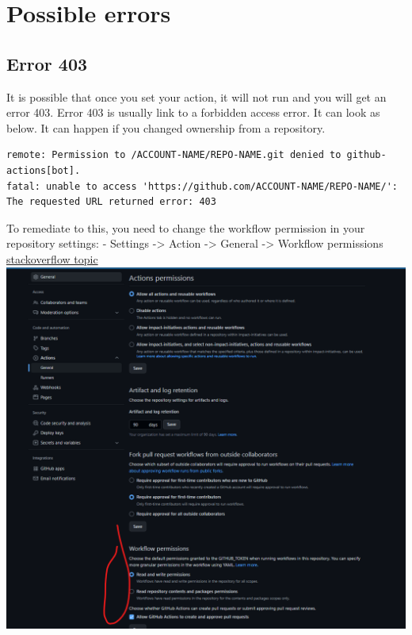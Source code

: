 \documentclass[
]{book}
\begin{document}
\hypertarget{possible-errors}{%
\section{Possible errors}\label{possible-errors}}

\hypertarget{error-403}{%
\subsection{Error 403}\label{error-403}}

It is possible that once you set your action, it will not run and you will get an error 403. Error
403 is usually link to a forbidden access error. It can look as below. It can happen if you changed ownership from a repository.

\begin{verbatim}
remote: Permission to /ACCOUNT-NAME/REPO-NAME.git denied to github-actions[bot].
fatal: unable to access 'https://github.com/ACCOUNT-NAME/REPO-NAME/': The requested URL returned error: 403
\end{verbatim}

To remediate to this, you need to change the workflow permission in your repository settings:
- Settings -\textgreater{} Action -\textgreater{} General -\textgreater{} Workflow permissions \href{https://stackoverflow.com/questions/73687176/permission-denied-to-github-actionsbot-the-requested-url-returned-error-403}{stackoverflow topic}
\includegraphics{images/styler/workflow permissions.png}
\end{document}
